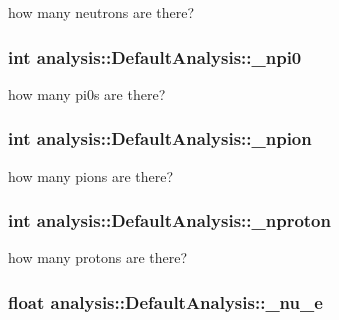 how many neutrons are there? \hypertarget{classanalysis_1_1DefaultAnalysis_ab6eca9a94c20a6fb7e127043f165ff9b}{
\subsubsection[{\-\_\-npi0}]{\setlength{\rightskip}{0pt plus 5cm}int analysis\-::\-Default\-Analysis\-::\-\_\-npi0\hspace{0.3cm}{\ttfamily [private]}}}\label{classanalysis_1_1DefaultAnalysis_ab6eca9a94c20a6fb7e127043f165ff9b}
how many pi0s are there? \hypertarget{classanalysis_1_1DefaultAnalysis_a39a918abd4b60bf475907f5778ba5e9a}{
\subsubsection[{\-\_\-npion}]{\setlength{\rightskip}{0pt plus 5cm}int analysis\-::\-Default\-Analysis\-::\-\_\-npion\hspace{0.3cm}{\ttfamily [private]}}}\label{classanalysis_1_1DefaultAnalysis_a39a918abd4b60bf475907f5778ba5e9a}
how many pions are there? \hypertarget{classanalysis_1_1DefaultAnalysis_a10ce44826114a375e883d727ed0ad876}{
\subsubsection[{\-\_\-nproton}]{\setlength{\rightskip}{0pt plus 5cm}int analysis\-::\-Default\-Analysis\-::\-\_\-nproton\hspace{0.3cm}{\ttfamily [private]}}}\label{classanalysis_1_1DefaultAnalysis_a10ce44826114a375e883d727ed0ad876}
how many protons are there? \hypertarget{classanalysis_1_1DefaultAnalysis_a41a1c23e4cb1a09e08024c7fa33572ce}{
\subsubsection[{\-\_\-nu\-\_\-e}]{\setlength{\rightskip}{0pt plus 5cm}float analysis\-::\-Default\-Analysis\-::\-\_\-nu\-\_\-e\hspace{0.3cm}{\ttfamily [private]}}}\label{classanalysis_1_1DefaultAnalysis_a41a1c23e4cb1a09e08024c7fa33572ce}
